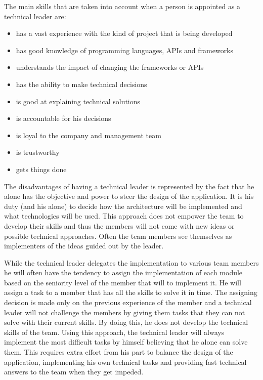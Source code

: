 The main skills that are taken into account when a person is appointed as a technical leader are:

\begin{itemize}
\item has a vast experience with the kind of project that is being developed
\item has good knowledge of programming languages, APIs and frameworks
\item understands the impact of changing the frameworks or APIs
\item has the ability to make technical decisions
\item is good at explaining technical solutions
\item is accountable for his decisions
\item is loyal to the company and management team
\item is trustworthy
\item gets things done
\end{itemize}

The disadvantages of having a technical leader is represented by the fact that he alone has the objective and power to steer the design of the application. It is his duty (and his alone) to decide how the architecture will be implemented and what technologies will be used. This approach does not empower the team to develop their skills and thus the members will not come with new ideas or possible technical approaches. Often the team members see themselves as implementers of the ideas guided out by the leader. 

While the technical leader delegates the implementation to various team members he will often have the tendency to assign the implementation of each module based on the seniority level of the member that will to implement it. He will assign a task to a member that has all the skills to solve it in time. The assigning decision is made only on the previous experience of the member and a technical leader will not challenge the members by giving them tasks that they can not solve with their current skills. By doing this, he does not develop the technical skills of the team. Using this approach, the technical leader will always implement the most difficult tasks by himself believing that he alone can solve them. This requires extra effort from his part to balance the design of the application, implementing his own technical tasks and providing fast technical answers to the team when they get impeded.

